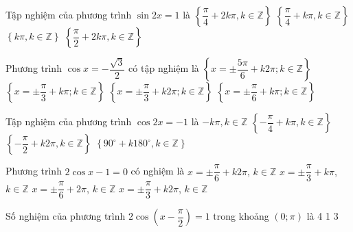 \begin{ex}%
	Tập nghiệm của phương trình $\sin2x=1$ là
	\choice
	{$\left\{\dfrac{\pi}{4}+2k\pi,k\in\mathbb{Z}\right\}$}
	{\True $\left\{\dfrac{\pi}{4}+k\pi,k\in\mathbb{Z}\right\}$}
	{$\left\{k\pi,k\in\mathbb{Z}\right\}$}
	{$\left\{\dfrac{\pi}{2}+2k\pi,k\in\mathbb{Z}\right\}$}
\end{ex}

\begin{ex}%
	Phương trình $ \cos x=-\dfrac{\sqrt{3}}{2} $ có tập nghiệm là
	\choice
	{\True $\left\{x=\pm \dfrac{5\pi}{6}+k2\pi; k\in \mathbb{Z} \right\}$}
	{$\left\{x=\pm \dfrac{\pi}{3}+k\pi; k\in \mathbb{Z} \right\}$}
	{$\left\{x=\pm \dfrac{\pi}{3}+k2\pi; k\in \mathbb{Z} \right\}$}
	{$\left\{x=\pm \dfrac{\pi}{6}+k\pi; k\in \mathbb{Z} \right\}$}
\end{ex}

\begin{ex}
	Tập nghiệm của phương trình $\cos 2x = -1$ là
	\choice
	{$-k\pi, k \in \mathbb{Z}$}
	{$\left\{-\dfrac{\pi}{4} + k\pi, k \in \mathbb{Z}\right\}$}
	{$\left\{-\dfrac{\pi}{2} + k2\pi, k \in \mathbb{Z}\right\}$}
	{\True $\left\{90^\circ + k180^\circ, k \in \mathbb{Z}\right\}$}
\end{ex}

\begin{ex}%
	Phương trình $2\cos x-1=0$ có nghiệm là
	\choice
	{$x=\pm \dfrac{\pi}{6}+k2\pi$, $k\in \mathbb{Z}$}
	{$x=\pm \dfrac{\pi}{3}+k\pi$, $k\in \mathbb{Z}$}
	{$x=\pm \dfrac{\pi}{6}+2\pi$, $k\in \mathbb{Z}$}
	{\True $x=\pm \dfrac{\pi}{3}+k2\pi$, $k\in \mathbb{Z}$}
\end{ex}

\begin{ex}%
	Số nghiệm của phương trình $2\cos\left(x-\dfrac{\pi}{2}\right)=1$ trong khoảng $(0;\pi)$ là
	\choice
	{4}
	{1}
	{}
	{3}
	\loigiai{
	}
\end{ex}

